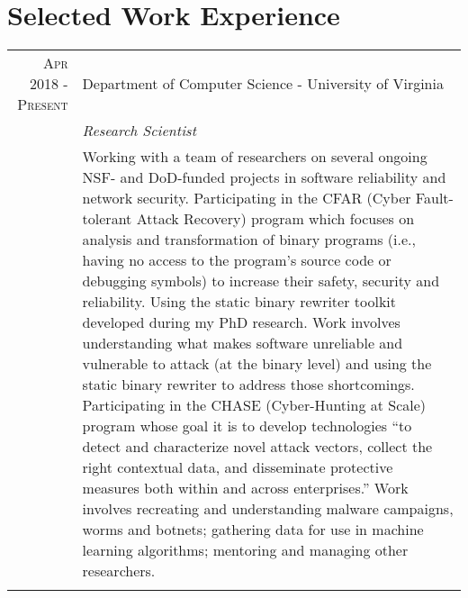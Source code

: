 \documentclass[a4paper,10pt]{article} %
\begin{document}
\section{Selected Work Experience}
\begin{tabular}{r|p{11cm}}

\textsc{Apr 2018 - Present} & Department of Computer Science - University of Virginia \\
& \emph{Research Scientist}\\ 
& \footnotesize{Working with a team of researchers on several ongoing NSF- and DoD-funded projects in software reliability and network security. Participating in the CFAR (Cyber Fault-tolerant Attack Recovery) program which focuses on analysis and transformation of binary programs (i.e., having no access to the program's source code or debugging symbols) to increase their safety, security and reliability. Using the static binary rewriter toolkit developed during my PhD research. Work involves understanding what makes software unreliable and vulnerable to attack (at the binary level) and using the static binary rewriter to address those shortcomings. Participating in the CHASE (Cyber-Hunting at Scale) program whose goal it is to develop technologies ``to detect and characterize novel attack vectors, collect the right contextual data, and disseminate protective measures both within and across enterprises.'' Work involves recreating and understanding malware campaigns, worms and botnets; gathering data for use in machine learning algorithms; mentoring and managing other researchers.}\\
\multicolumn{2}{c}{ } \\



\end{tabular}
\end{document}
